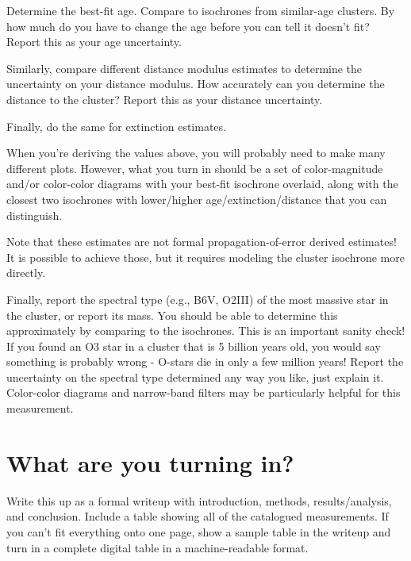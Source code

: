 \documentclass[11pt]{article}
\begin{document}
Determine the best-fit age.  Compare to isochrones from similar-age clusters.  By how much
do you have to change the age before you can tell it doesn't fit?  Report this as your age uncertainty.

Similarly, compare different distance modulus estimates to determine the uncertainty on your distance
modulus.  How accurately can you determine the distance to the cluster?  Report this as your distance uncertainty.

Finally, do the same for extinction estimates.

When you're deriving the values above, you will probably need to make many different plots.
However, what you turn in should be a set of color-magnitude and/or color-color diagrams
with your best-fit isochrone overlaid, along with the closest two isochrones
with lower/higher age/extinction/distance that you can distinguish.


Note that these estimates are not formal propagation-of-error derived estimates!  It is possible to achieve
those, but it requires modeling the cluster isochrone more directly.


Finally, report the spectral type (e.g., B6V, O2III) of the most massive star in the cluster, or report its mass.
You should be able to determine this approximately by comparing to the isochrones.
This is an important sanity check!  If you found an O3 star in a cluster that is 5 billion years old, you would say
something is probably wrong - O-stars die in only a few million years!
Report the uncertainty on the spectral type determined any way you like, just explain it.
Color-color diagrams and narrow-band filters may be particularly helpful for this measurement.

\section{What are you turning in?}

Write this up as a formal writeup with introduction, methods, results/analysis, and conclusion.
Include a table showing all of the catalogued measurements.  If you can't fit
everything onto one page, show a sample table in the writeup and turn in a
complete digital table in a machine-readable format.
\end{document}
